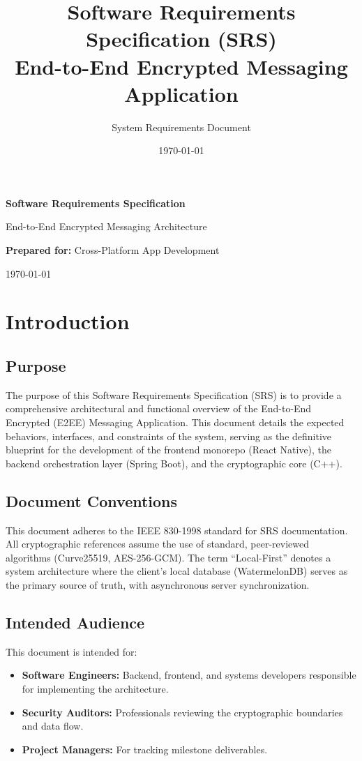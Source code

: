 \documentclass[12pt, a4paper]{article}
\title{\textbf{Software Requirements Specification (SRS)}\\ \large End-to-End Encrypted Messaging Application}
\author{System Requirements Document}
\date{\today}
\begin{document}
\begin{titlepage}
    \centering
    \vspace*{\fill}
    {\Huge \textbf{Software Requirements Specification} \par}
    \vspace{0.5cm}
    {\large End-to-End Encrypted Messaging Architecture \par}
    \vspace{1cm}
    {\Large \textbf{Prepared for:} Cross-Platform App Development \par}
    \vspace{0.5cm}
    {\large \today \par}
    \vspace*{\fill}
\end{titlepage}

\tableofcontents
\newpage

\section{Introduction}
\subsection{Purpose}
The purpose of this Software Requirements Specification (SRS) is to provide a comprehensive architectural and functional overview of the End-to-End Encrypted (E2EE) Messaging Application. This document details the expected behaviors, interfaces, and constraints of the system, serving as the definitive blueprint for the development of the frontend monorepo (React Native), the backend orchestration layer (Spring Boot), and the cryptographic core (C++).

\subsection{Document Conventions}
This document adheres to the IEEE 830-1998 standard for SRS documentation. All cryptographic references assume the use of standard, peer-reviewed algorithms (Curve25519, AES-256-GCM). The term ``Local-First'' denotes a system architecture where the client's local database (WatermelonDB) serves as the primary source of truth, with asynchronous server synchronization.

\subsection{Intended Audience}
This document is intended for:
\begin{itemize}
    \item \textbf{Software Engineers:} Backend, frontend, and systems developers responsible for implementing the architecture.
    \item \textbf{Security Auditors:} Professionals reviewing the cryptographic boundaries and data flow.
    \item \textbf{Project Managers:} For tracking milestone deliverables.
\end{itemize}
\end{document}
